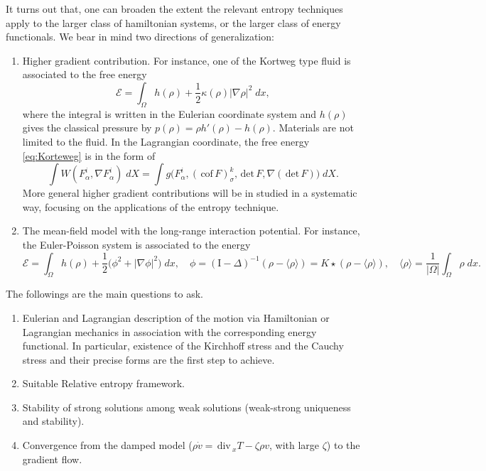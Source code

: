 \documentclass[a4paper,11pt]{article}
\def\div{\,\textrm{div}\,}
\def\cof{\,\textrm{cof}\,}
\def\det{\,\textrm{det}\,}
\def\E{\mathcal{E}}
\begin{document}
It turns out that, one can broaden the extent the relevant entropy techniques apply to the larger class of hamiltonian systems, or the larger class of energy functionals. We bear in mind two directions of generalization: 
\begin{enumerate}
 \item Higher gradient contribution. For instance, one of the Kortweg type fluid is associated to the free energy
\begin{equation}
 \E = \int_\Omega h(\rho) + \frac{1}{2}\kappa(\rho) |\nabla \rho|^2 \;dx, \label{eq:Korteweg}
\end{equation}
where the integral is written in the Eulerian coordinate system and $h(\rho)$ gives the classical pressure by $p(\rho) = \rho h'(\rho)- h(\rho)$. Materials are not limited to the fluid. In the Lagrangian coordinate, the free energy \eqref{eq:Korteweg} is in the form of 
$$ \int W(F^i_\alpha, \nabla F^i_\alpha) \; dX = \int g\Big(F^i_\alpha, (\cof F)^{k}_\sigma, \det F, \nabla (\det F)\Big) \; dX.$$
More general higher gradient contributions will be in studied in a systematic way, focusing on the applications of the entropy technique.
 \item The mean-field model with the long-range interaction potential. For instance, the Euler-Poisson system is associated to the energy
\begin{equation}
 \E = \int_\Omega h(\rho) + \frac{1}{2} \Big(\phi^2+|\nabla \phi|^2\Big) \;dx, \quad \phi = (\textrm{I}-\Delta)^{-1} (\rho-\langle\rho\rangle)=K\star(\rho-\langle\rho\rangle), \quad \text{$\langle\rho\rangle = \frac{1}{|\Omega|}\int_\Omega \rho \; dx$}. \label{eq:E-P} 
\end{equation}
\end{enumerate}

The followings are the main questions to ask.
\begin{enumerate}
 \item Eulerian and Lagrangian description of the motion via Hamiltonian or Lagrangian mechanics in association with the corresponding energy functional. In particular, existence of the Kirchhoff stress and the Cauchy stress and their precise forms are the first step to achieve.
 \item Suitable Relative entropy framework.
 \item Stability of strong solutions among weak solutions (weak-strong uniqueness and stability).
 \item Convergence from the damped model ($\displaystyle \rho\dot{v} = \div_x T - \zeta \rho v$, with large $\zeta$) to the gradient flow.
\end{enumerate}
\end{document}
